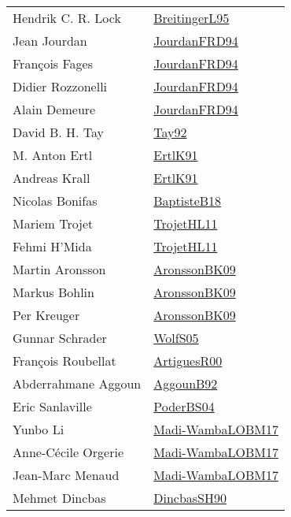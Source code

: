 {\begin{longtable}{p{4cm}p{15cm}}
Hendrik C. R. Lock & \href{}{BreitingerL95}\cite{BreitingerL95} \\
Jean Jourdan & \href{papers/JourdanFRD94.pdf}{JourdanFRD94}\cite{JourdanFRD94} \\
Fran{\c{c}}ois Fages & \href{papers/JourdanFRD94.pdf}{JourdanFRD94}\cite{JourdanFRD94} \\
Didier Rozzonelli & \href{papers/JourdanFRD94.pdf}{JourdanFRD94}\cite{JourdanFRD94} \\
Alain Demeure & \href{papers/JourdanFRD94.pdf}{JourdanFRD94}\cite{JourdanFRD94} \\
David B. H. Tay & \href{articles/Tay92.pdf}{Tay92}\cite{Tay92} \\
M. Anton Ertl & \href{papers/ErtlK91.pdf}{ErtlK91}\cite{ErtlK91} \\
Andreas Krall & \href{papers/ErtlK91.pdf}{ErtlK91}\cite{ErtlK91} \\
Nicolas Bonifas & \href{articles/BaptisteB18.pdf}{BaptisteB18}\cite{BaptisteB18} \\
Mariem Trojet & \href{articles/TrojetHL11.pdf}{TrojetHL11}\cite{TrojetHL11} \\
Fehmi H'Mida & \href{articles/TrojetHL11.pdf}{TrojetHL11}\cite{TrojetHL11} \\
Martin Aronsson & \href{papers/AronssonBK09.pdf}{AronssonBK09}\cite{AronssonBK09} \\
Markus Bohlin & \href{papers/AronssonBK09.pdf}{AronssonBK09}\cite{AronssonBK09} \\
Per Kreuger & \href{papers/AronssonBK09.pdf}{AronssonBK09}\cite{AronssonBK09} \\
Gunnar Schrader & \href{papers/WolfS05.pdf}{WolfS05}\cite{WolfS05} \\
Fran{\c{c}}ois Roubellat & \href{articles/ArtiguesR00.pdf}{ArtiguesR00}\cite{ArtiguesR00} \\
Abderrahmane Aggoun & \href{papers/AggounB92.pdf}{AggounB92}\cite{AggounB92} \\
Eric Sanlaville & \href{articles/PoderBS04.pdf}{PoderBS04}\cite{PoderBS04} \\
Yunbo Li & \href{papers/Madi-WambaLOBM17.pdf}{Madi-WambaLOBM17}\cite{Madi-WambaLOBM17} \\
Anne{-}C{\'{e}}cile Orgerie & \href{papers/Madi-WambaLOBM17.pdf}{Madi-WambaLOBM17}\cite{Madi-WambaLOBM17} \\
Jean{-}Marc Menaud & \href{papers/Madi-WambaLOBM17.pdf}{Madi-WambaLOBM17}\cite{Madi-WambaLOBM17} \\
Mehmet Dincbas & \href{articles/DincbasSH90.pdf}{DincbasSH90}\cite{DincbasSH90} \\
\end{longtable}
}

